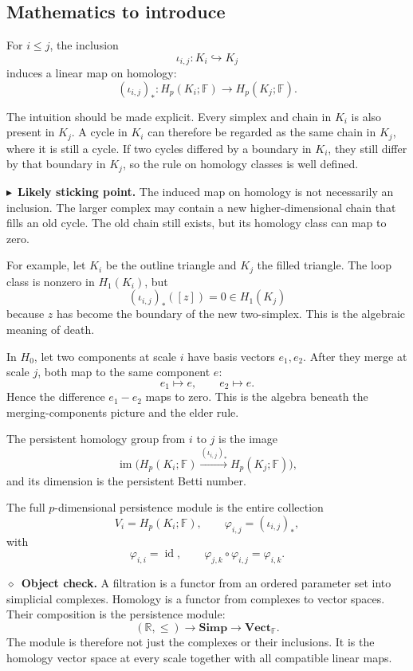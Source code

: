 \documentclass[11pt,a4paper]{article}
\newcommand{\planningbox}[2]{%
\subsection*{#1}
#2
}
\newcommand{\stickingpoint}[1]{%
\par\smallskip
\noindent\textcolor{red!65!black}{\(\blacktriangleright\)\ \textbf{Likely sticking point.}} #1
\par\smallskip
}
\newcommand{\objectcheck}[1]{%
\par\smallskip
\noindent\textcolor{green!45!black}{\(\diamond\)\ \textbf{Object check.}} #1
\par\smallskip
}
\begin{document}
\planningbox{Mathematics to introduce}{
For \(i\leq j\), the inclusion
\[
\iota_{i,j}:K_i\hookrightarrow K_j
\]
induces a linear map on homology:
\[
(\iota_{i,j})_*:H_p(K_i;\mathbb F)\to H_p(K_j;\mathbb F).
\]

The intuition should be made explicit. Every simplex and chain in \(K_i\) is
also present in \(K_j\). A cycle in \(K_i\) can therefore be regarded as the
same chain in \(K_j\), where it is still a cycle. If two cycles differed by a
boundary in \(K_i\), they still differ by that boundary in \(K_j\), so the rule
on homology classes is well defined.

\stickingpoint{The induced map on homology is not necessarily an inclusion.
The larger complex may contain a new higher-dimensional chain that fills an old
cycle. The old chain still exists, but its homology class can map to zero.}

For example, let \(K_i\) be the outline triangle and \(K_j\) the filled
triangle. The loop class is nonzero in \(H_1(K_i)\), but
\[
(\iota_{i,j})_*([z])=0\in H_1(K_j)
\]
because \(z\) has become the boundary of the new two-simplex. This is the
algebraic meaning of death.

In \(H_0\), let two components at scale \(i\) have basis vectors \(e_1,e_2\).
After they merge at scale \(j\), both map to the same component \(e\):
\[
e_1\mapsto e,\qquad e_2\mapsto e.
\]
Hence the difference \(e_1-e_2\) maps to zero. This is the algebra beneath the
merging-components picture and the elder rule.

The persistent homology group from \(i\) to \(j\) is the image
\[
\operatorname{im}\!\bigl(
H_p(K_i;\mathbb F)\xrightarrow{(\iota_{i,j})_*}H_p(K_j;\mathbb F)
\bigr),
\]
and its dimension is the persistent Betti number.

The full \(p\)-dimensional persistence module is the entire collection
\[
V_i=H_p(K_i;\mathbb F),\qquad
\varphi_{i,j}=(\iota_{i,j})_*,
\]
with
\[
\varphi_{i,i}=\operatorname{id},
\qquad
\varphi_{j,k}\circ\varphi_{i,j}=\varphi_{i,k}.
\]

\objectcheck{A filtration is a functor from an ordered parameter set into
simplicial complexes. Homology is a functor from complexes to vector spaces.
Their composition is the persistence module:
\[
(\mathbb R,\leq)\longrightarrow \mathbf{Simp}
\longrightarrow \mathbf{Vect}_{\mathbb F}.
\]
The module is therefore not just the complexes or their inclusions. It is the
homology vector space at every scale together with all compatible linear maps.}

}
\end{document}
